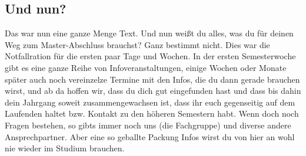 \subsection{Und nun?}
Das war nun eine ganze Menge Text. Und nun weißt du alles, was du für deinen Weg zum Master-Abschluss brauchst? Ganz bestimmt nicht. Dies war die Notfallration für die ersten paar Tage und Wochen. In der ersten Semesterwoche gibt es eine ganze Reihe von Infoveranstaltungen, einige Wochen oder Monate später auch noch vereinzelze Termine mit den Infos, die du dann gerade brauchen wirst, und ab da hoffen wir, dass du dich gut eingefunden hast und dass bis dahin dein Jahrgang soweit zusammengewachsen ist, dass ihr euch gegenseitig auf dem Laufenden haltet bzw. Kontakt zu den höheren Semestern habt. Wenn doch noch Fragen bestehen, so gibts immer noch uns (die Fachgruppe) und diverse andere Ansprechpartner. Aber eine so geballte Packung Infos wirst du von hier an wohl nie wieder im Studium brauchen.


